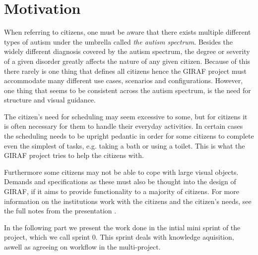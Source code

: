 \section{Motivation}
When referring to citizens, one must be aware that there exists multiple different types of autism under the umbrella called \textit{the autism spectrum}.
Besides the widely different diagnosis covered by the autism spectrum, the degree or severity of a given disorder greatly affects the nature of any given citizen.
Because of this there rarely is one thing that defines all citizens hence the GIRAF project must accommodate many different use cases, scenarios and configurations.
However, one thing that seems to be consistent across the autism spectrum, is the need for structure and visual guidance.

The citizen's need for scheduling may seem excessive to some, but for citizens it is often necessary for them to handle their everyday activities.
In certain cases the scheduling needs to be upright pedantic in order for some citizens to complete even the simplest of tasks, e.g. taking a bath or using a toilet.
This is what the GIRAF project tries to help the citizens with.

Furthermore some citizens may not be able to cope with large visual objects.
Demands and specifications as these must also be thought into the design of GIRAF, if it aims to provide functionality to a majority of citizens.
For more information on the institutions work with the citizens and the citizen's needs, see the full notes from the presentation \cite{GIRAF20161stMeeting}.

In the following part we present the work done in the intial mini sprint of the project, which we call sprint 0.
This sprint deals with knowledge aquisition, aswell as agreeing on workflow in the multi-project.

